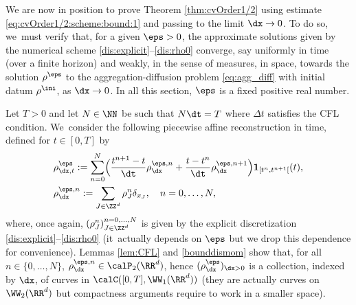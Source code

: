 We are now in position to prove Theorem \ref{thm:cvOrder1/2} using estimate \eqref{eq:cvOrder1/2:scheme:bound:1} and passing to the limit $\dx \to 0$. To do so, we~must verify that, for a given $\eps >0$, the approximate solutions given by the numerical scheme \eqref{dis:explicit}--\eqref{dis:rho0} converge, say uniformly in time (over a finite horizon) and weakly, in the sense of measures, in space, towards the solution $\rho^\eps$ to the aggregation-diffusion problem \eqref{eq:agg_diff} with initial datum $\rho^{\ini}$, as $\dx \to 0$. In all this section, $\eps$ is a fixed positive real number.

Let $T > 0$ and let $N \in \NN$ be such that $N\dt = T$ where $\Delta t$ satisfies the CFL condition. We~consider the following piecewise affine reconstruction in time, defined for $t \in [0,T]$ by
\begin{subequations}
\begin{align}
& \rho_{\dx, t}^{\eps} := \sum_{n=0}^N \Bigl(\frac{t^{n+1} - t}{\dt} \rho_{\dx}^{\eps,n} + \frac{t-t^n}{\dt}\rho_{\dx}^{\eps,n+1}\Bigr) {\mathbf 1}_{[t^n, t^{n+1}[}(t), \label{rhoaff}\\
& \rho_{\dx}^{\eps,n} := \sum_{J\in \ZZ^d} \rho_J^n \delta_{x_J}, \quad n = 0, \ldots, N,
\end{align}
\end{subequations}
where, once again, $(\rho_J^n)_{J\in\ZZ^d}^{n=0,\ldots,N}$ is given by the explicit discretization \eqref{dis:explicit}--\eqref{dis:rho0} (it~actually depends on $\eps$ but we drop this dependence for convenience). Lemmas \ref{lem:CFL} and \ref{bounddismom} show that, for all $n \in \{0,\ldots,N\}$, $\rho_{\dx}^{\eps,n} \in \calP_2(\RR^d)$, hence $(\rho_{\dx}^\eps)_{\dx > 0}$ is a collection, indexed by $\dx$, of curves in $\calC([0,T], \WW_1(\RR^d))$ (they are actually curves on $\WW_2(\RR^d)$ but compactness arguments require to work in a smaller space).

